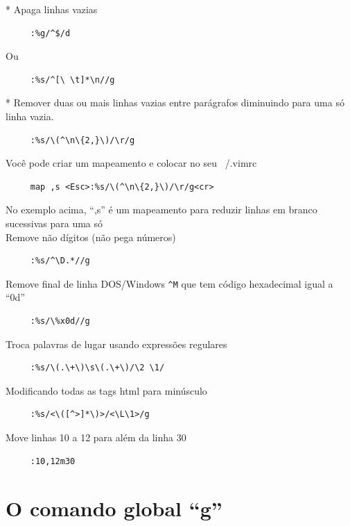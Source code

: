 \documentclass[10pt,a4paper,openany]{book}
\begin{document}
* Apaga linhas vazias

\begin{verbatim}
     :%g/^$/d
\end{verbatim}

Ou

\begin{verbatim}
     :%s/^[\ \t]*\n//g
\end{verbatim}

* Remover duas ou mais linhas vazias entre parágrafos diminuindo para
uma só linha vazia.

\begin{verbatim}
     :%s/\(^\n\{2,}\)/\r/g
\end{verbatim}

Você pode criar um mapeamento e colocar no seu ~/.vimrc

\begin{verbatim}
     map ,s <Esc>:%s/\(^\n\{2,}\)/\r/g<cr>
\end{verbatim}

No exemplo acima, ``,s'' é um mapeamento para reduzir linhas em branco
sucessivas para uma só  \\


Remove não dígitos (não pega números)

\begin{verbatim}
     :%s/^\D.*//g
\end{verbatim}

Remove final de linha DOS/Windows \verb|^M| que tem código hexadecimal igual a
``0d''

\begin{verbatim}
     :%s/\%x0d//g
\end{verbatim}

Troca palavras de lugar usando expressões regulares

\begin{verbatim}
     :%s/\(.\+\)\s\(.\+\)/\2 \1/
\end{verbatim}

Modificando todas as tags html para minúsculo

\begin{verbatim}
     :%s/<\([^>]*\)>/<\L\1>/g
\end{verbatim}

Move linhas 10 a 12 para além da linha 30

\begin{verbatim}
     :10,12m30
\end{verbatim}

\section{O comando global ``g''}\label{sec:O comando global ``g''}
\end{document}
